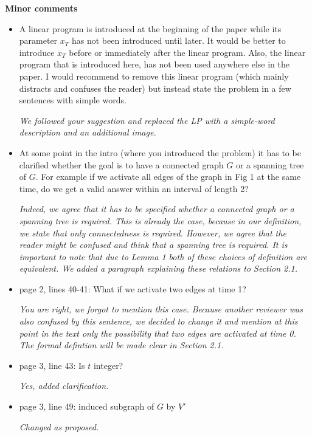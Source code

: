 \documentclass[11pt,a4paper]{article}
\begin{document}
\textbf{Minor comments}

\begin{itemize}

\item A linear program is introduced at the beginning of the paper while its parameter $x_T$ has not been introduced until later. It would be better to introduce $x_T$ before or immediately after the linear program. 
Also, the linear program that is introduced here, has not been used anywhere else in the paper. I would recommend to remove this linear program (which mainly distracts and confuses the reader) but instead state the problem in a few sentences with simple words.

\textit{We followed your suggestion and replaced the LP with a simple-word description and an additional image. }

\item At some point in the intro (where you introduced the problem) it has to be clarified whether the goal is to have a connected graph $G$ or a spanning tree of $G$. For example if we activate all edges of the graph in Fig 1 at the same time, do we get a valid answer within an interval of length 2? 

\textit{ Indeed, we agree that it has to be specified whether a connected graph or a spanning tree is required. This is already the case, because in our definition, we state that only connectedness is required.  However, we agree that the reader might be confused and think that a spanning tree is required. It is important to note that due to Lemma 1 both of these choices of definition are equivalent. We added a paragraph explaining these relations to Section 2.1.}

\item page 2, lines 40-41: What if we activate two edges at time 1?

\textit{You are right, we forgot to mention this case. Because another reviewer was also confused by this sentence, we decided to change it and mention at this point in the text only the possibility that two edges are activated at time 0. The formal defintion will be made clear in Section 2.1. }

\item page 3, line 43: Is $t$ integer?

\textit{Yes, added clarification.}

\item page 3, line 49: induced subgraph of $G$ by $V'$

\textit{Changed as proposed.}


\end{itemize}
\end{document}
